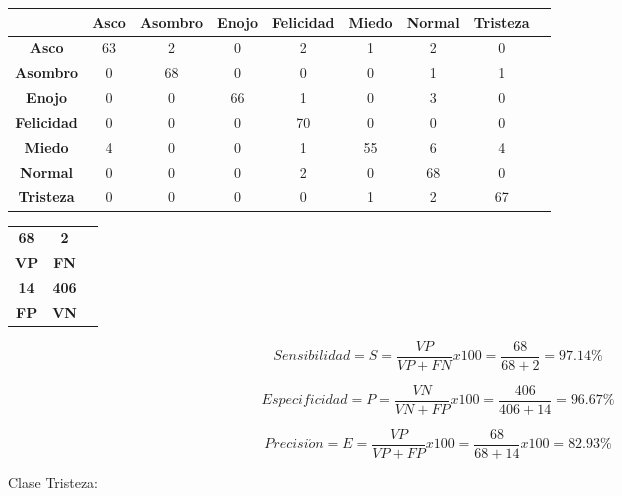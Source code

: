 \begin{table}[ht!]
\centering
\begin{tabular}{|c|c|c|c|c|c|c|c|c|} \hline
 & \bf Asco & \bf Asombro & \bf Enojo & \bf Felicidad & \bf Miedo & \bf Normal & \bf Tristeza \\ \hline
\bf Asco & 63 & 2 & 0 & 2 & 1 & 2 & 0 \\ \hline
\bf Asombro & 0 & 68 & 0 & 0 & 0 & 1 & 1 \\ \hline
\bf Enojo & 0 & 0 & 66 & 1 & 0 & 3 & 0 \\ \hline
\bf Felicidad & 0 & 0 & 0 & 70 & 0 & 0 & 0 \\ \hline
\bf Miedo & 4 & 0 & 0 & 1 & 55 & 6 & 4 \\ \hline
\bf Normal & 0 & 0 & 0 & 2 & 0 & 68 & 0 \\ \hline
\bf Tristeza & 0 & 0 & 0 & 0 & 1 & 2 & 67 \\ \hline

\end{tabular}
\end{table}

\begin{table}[ht!]
\centering
\begin{tabular}{|c|c|c|} \hline
\bf 68 \par & \bf 2 \par \\
\bf VP & \bf FN \\ \hline
\bf 14 \par & \bf 406 \par \\ 
\bf FP & \bf VN \\ \hline 
\end{tabular}
\end{table}

\begin{equation}
Sensibilidad=S=\frac{VP}{VP+FN}x100=\frac{68}{68+2}=97.14\%
\end{equation}

\begin{equation}
Especificidad=P=\frac{VN}{VN+FP}x100=\frac{406}{406+14}=96.67\%
\end{equation}

\begin{equation}
Precisi\acute{o}n=E=\frac{VP}{VP+FP}x100=\frac{68}{68+14}x100=82.93\%
\end{equation}

\vskip 5cm

Clase Tristeza:


